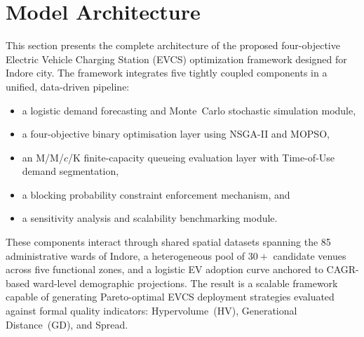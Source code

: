 %

\section{Model Architecture}
\label{sec:model_arch}

\noindent
This section presents the complete architecture of the proposed four-objective
Electric Vehicle Charging Station (EVCS) optimization framework designed for
Indore city. The framework integrates five tightly coupled components in a
unified, data-driven pipeline:

\begin{itemize}
    \item a logistic demand forecasting and Monte~Carlo stochastic simulation
          module,
    \item a four-objective binary optimisation layer using NSGA-II and MOPSO,
    \item an M/M/$c$/K finite-capacity queueing evaluation layer with
          Time-of-Use demand segmentation,
    \item a blocking probability constraint enforcement mechanism, and
    \item a sensitivity analysis and scalability benchmarking module.
\end{itemize}

\noindent
These components interact through shared spatial datasets spanning the 85
administrative wards of Indore, a heterogeneous pool of $30+$ candidate venues
across five functional zones, and a logistic EV adoption curve anchored to
CAGR-based ward-level demographic projections. The result is a scalable
framework capable of generating Pareto-optimal EVCS deployment strategies
evaluated against formal quality indicators: Hypervolume~(HV), Generational
Distance~(GD), and Spread.

\begin{center}
\end{center}



